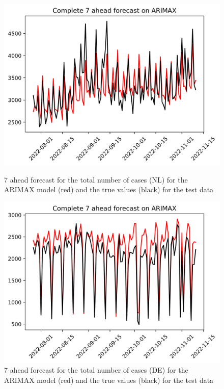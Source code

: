 \begin{figure}

\begin{minipage}{.45\textwidth}
  \centering
  \includegraphics[width=\linewidth]{pics/7_ah/Complete_7_ahead_ARIMAX.png}
  \caption{7 ahead forecast for the total number of cases (NL) for the ARIMAX model (red) and the true values (black) for the test data}
  \label{fig:tot_cases_fc_7_ARIMAX}
\end{minipage}
\begin{minipage}{.45\textwidth}
  \centering
  \includegraphics[width=\linewidth]{pics/7_ah/DE_Complete_7_ahead_ARIMAX.png}
  \caption{7 ahead forecast for the total number of cases (DE) for the ARIMAX model (red) and the true values (black) for the test data}
  \label{fig:tot_cases_fc_7_ARIMAX_DE}
\end{minipage}

\end{figure}
